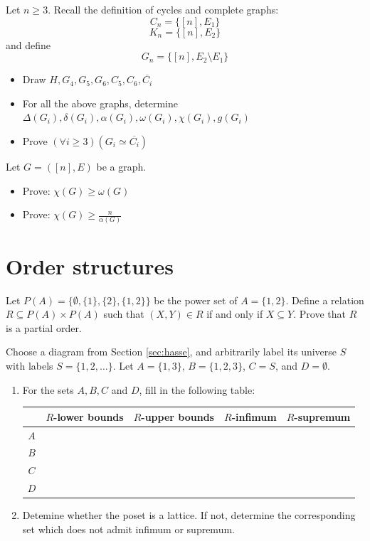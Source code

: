 \documentclass[11pt,paper=b5,footinclude,headinclude]{scrbook} %
\theoremstyle{remark}
\theoremstyle{definition} %
\theoremstyle{theorem} %
\newtheorem{ex}{Exercise\hypertarget{sol:\theex}}[chapter]
\begin{document}
\begin{ex}
    Let $n\ge 3$. Recall the definition of cycles and complete graphs:
\[C_{n}=\{[n], E_{1}\}\]
\[K_{n}=\{[n], E_{2}\}\]
and define
\[G_{n}=\{[n], E_{2} \setminus E_{1}\}\]
\begin{itemize}
    \item Draw \(H, G_{4}, G_{5}, G_{6}, C_{5}, C_{6}, \overline{C_{i}}\)
    \item For all the above graphs, determine \(\Delta(G_{i}), \delta(G_{i}), \alpha(G_{i}), \omega(G_{i}), \chi(G_{i}), g(G_{i})\)
    \item Prove \((\forall i \geq 3) (G_{i} \simeq \overline{C_{i}})\)
\end{itemize}

\end{ex}
\begin{ex}
 Let \(G = ([n], E)\) be a graph.
\begin{itemize}
\item Prove: \(\chi (G) \geq \omega (G)\)
\item Prove: \(\chi (G) \geq \frac{n}{\alpha(G)}\)
\end{itemize}
\end{ex}


\newpage
\section{Order structures}
\begin{ex}
Let \(P(A) = \{\emptyset, \{1\}, \{2\}, \{1, 2\}\}\) be the power set of \(A = \{1, 2\}\). Define a relation \(R \subseteq P(A) \times P(A)\) such that \((X, Y) \in R\) if and only if \(X \subseteq Y\).
    Prove that \(R\) is a partial order. 
\end{ex}

\begin{ex}
    Choose a diagram from Section \ref{sec:hasse}, and arbitrarily label its universe $S$ with labels $S=\{1,2,\dots\}$.
    Let $A=\{1,3\}$, $B=\{1,2,3\}$, $C=S$, and $D=\emptyset$. 
    \begin{enumerate}
        \item 
    For the sets $A,B,C$ and $D$, fill in the following table:

    \begin{tabular}{c|c|c|c|c}
         &$R$-lower bounds &$R$-upper bounds & $R$-infimum
         & $R$-supremum \\\hline
         $A$ &&&&\\
         $B$ &&&&\\
         $C$ &&&&\\
         $D$ &&&&
    \end{tabular}
\item Detemine whether the poset is a lattice. If not, determine the corresponding set which does not admit infimum or supremum.
    \end{enumerate}

\end{ex}
\end{document}
